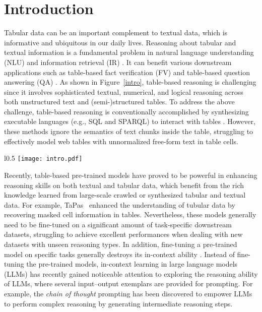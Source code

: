 \section{Introduction}

Tabular data can be an important complement to textual data, which is informative and ubiquitous in our daily lives. Reasoning about tabular and textual information is a fundamental problem in natural language understanding (NLU) and information retrieval (IR) \citep{wang2021retrieving}. 
It can benefit various downstream applications such as table-based fact verification (FV) \citep{tabfact,feverous,infotabs} and table-based question answering (QA) \citep{wtq,wikisql,fetaqa,cho2019sigirtable}. As shown in Figure~\ref{intro}, table-based reasoning is challenging since it involves sophisticated textual, numerical, and logical reasoning across both unstructured text and (semi-)structured tables. 
To address the above challenge, table-based reasoning is conventionally accomplished by synthesizing executable languages (e.g., SQL and SPARQL) to interact with tables \citep{sqlguide,sparql,Hui2021DynamicHR,Hui2022S2SQLIS}. However, these methods ignore the semantics of text chunks inside the table, struggling to effectively model web tables with unnormalized free-form text in table cells.

\begin{wrapfigure}{l}{0.5\textwidth}
    \centering
    \setlength{\abovecaptionskip}{5pt}
    \texttt{[image: intro.pdf]}
    \caption{An example of table-based reasoning.}
    \label{intro}
\end{wrapfigure}

Recently, table-based pre-trained models\citep{tapas,tapex,omnitab,pasta,Cai2022STARSG} have proved to be powerful in enhancing reasoning skills on both textual and tabular data, which benefit from the rich knowledge learned from large-scale crawled or synthesized tabular and textual data. For example, TaPas~\citep{tapas} enhanced the understanding of tubular data by recovering masked cell information in  tables. 
Nevertheless, these models generally need to be fine-tuned on a significant amount of task-specific downstream datasets, struggling to achieve excellent performances when dealing with new datasets with unseen reasoning types. In addition, fine-tuning a pre-trained model on specific tasks generally destroys its in-context ability \citep{wang2022preserving}. Instead of fine-tuning the pre-trained models, in-context learning in large language models (LLMs) \citep{gpt3,cot,zerocot,min2022rethinking} has recently gained noticeable attention to exploring the reasoning ability of LLMs, where several input–output exemplars are provided for prompting. For example, the \textit{chain of thought} prompting \citep{cot} has been discovered to empower LLMs to perform complex reasoning by generating intermediate reasoning steps.

